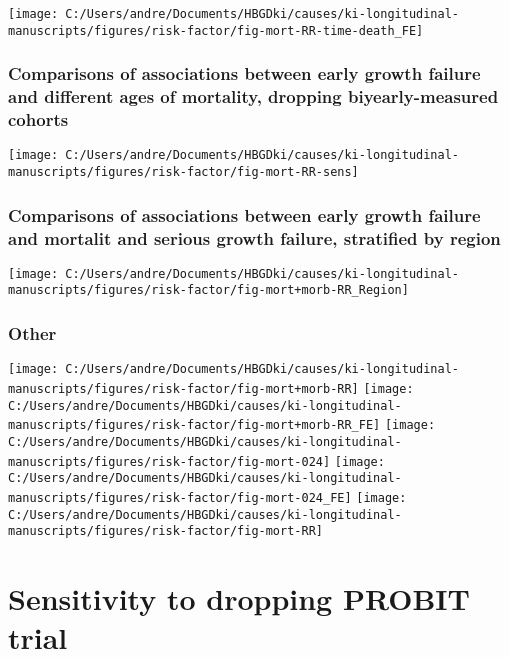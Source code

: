 \documentclass[9pt,]{book}
\begin{document}
\texttt{[image: C:/Users/andre/Documents/HBGDki/causes/ki-longitudinal-manuscripts/figures/risk-factor/fig-mort-RR-time-death\_FE]}

\subsection{Comparisons of associations between early growth failure and
different ages of mortality, dropping biyearly-measured
cohorts}\label{comparisons-of-associations-between-early-growth-failure-and-different-ages-of-mortality-dropping-biyearly-measured-cohorts}

\texttt{[image: C:/Users/andre/Documents/HBGDki/causes/ki-longitudinal-manuscripts/figures/risk-factor/fig-mort-RR-sens]}

\subsection{Comparisons of associations between early growth failure and
mortalit and serious growth failure, stratified by
region}\label{comparisons-of-associations-between-early-growth-failure-and-mortalit-and-serious-growth-failure-stratified-by-region}

\texttt{[image: C:/Users/andre/Documents/HBGDki/causes/ki-longitudinal-manuscripts/figures/risk-factor/fig-mort+morb-RR\_Region]}

\subsection{Other}\label{other}

\texttt{[image: C:/Users/andre/Documents/HBGDki/causes/ki-longitudinal-manuscripts/figures/risk-factor/fig-mort+morb-RR]}
\texttt{[image: C:/Users/andre/Documents/HBGDki/causes/ki-longitudinal-manuscripts/figures/risk-factor/fig-mort+morb-RR\_FE]}
\texttt{[image: C:/Users/andre/Documents/HBGDki/causes/ki-longitudinal-manuscripts/figures/risk-factor/fig-mort-024]}
\texttt{[image: C:/Users/andre/Documents/HBGDki/causes/ki-longitudinal-manuscripts/figures/risk-factor/fig-mort-024\_FE]}
\texttt{[image: C:/Users/andre/Documents/HBGDki/causes/ki-longitudinal-manuscripts/figures/risk-factor/fig-mort-RR]}

\chapter{Sensitivity to dropping PROBIT trial}\label{no-PROBIT}
\end{document}
